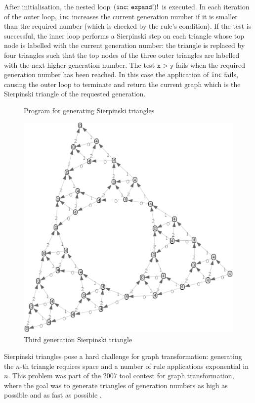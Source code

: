 After initialisation, the nested loop $\mathtt{(inc;\, expand!)!}$ is executed. In each iteration of the outer loop, \texttt{inc} increases the current generation number if it is smaller than the required number (which is checked by the rule's condition). If the test is successful, the inner loop  performs a Sierpinski step on each triangle whose top node is labelled with the current generation number: the triangle is replaced by four triangles such that the top nodes of the three outer triangles are labelled with the next higher generation number. The test $\mathtt{x > y}$ fails when the required generation number has been reached. In this case the application of \texttt{inc} fails, causing the outer loop to terminate and return the current graph which is the Sierpinski triangle of the requested generation.

\begin{figure}[p]
\begin{center}

\end{center}
\caption{Program for generating Sierpinski triangles}\label{fig:Sierpinski-program}
 \begin{center}
  \includegraphics[scale=.35,angle=-15]{sierpinski-3.eps}
 \end{center}
\vspace*{-2.5cm}
\caption{Third generation Sierpinski triangle \label{fig:sierpinski}}
\end{figure}

Sierpinski triangles pose a hard challenge for graph transformation: generating the $n$-th triangle requires space and a number of rule applications exponential in $n$. This problem was part of the 2007 tool contest for graph transformation, where the goal was to generate triangles of generation numbers as high as possible and as fast as possible \cite{Taentzer_et_al08a}.
